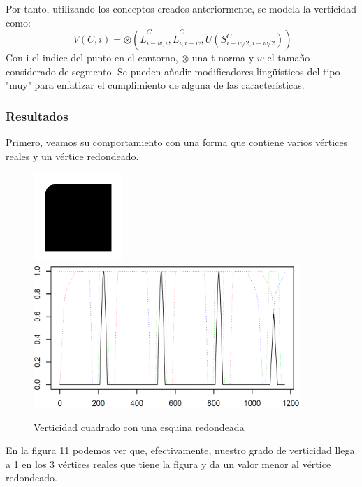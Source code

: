 Por tanto, utilizando los conceptos creados anteriormente, se modela la verticidad como:\\

\[
\ \tilde{V}(C,i) = \otimes \left(\tilde{L}^C_{i-w,i}, \tilde{L}^C_{i,i+w},  \tilde{U}(S^C_{i-w/2,i+w/2})   \right)
\]
Con i el indice del punto en el contorno, $ \otimes $ una t-norma y $w$ el tamaño considerado de segmento. Se pueden añadir modificadores lingüísticos del tipo "muy" para enfatizar el cumplimiento de alguna de las características.

\subsubsection{Resultados}

Primero, veamos su comportamiento con una forma que contiene varios vértices reales y un vértice redondeado.\\

\begin{figure}[H]
\begin{center}

\includegraphics[width=0.3\textwidth]{img/fig4.png}
\newline
\includegraphics[width=0.9\textwidth]{img/vert-fig04-novvery.png}
\end{center}

\caption{Verticidad cuadrado con una esquina redondeada}
\end{figure}

En la figura 11 podemos ver que, efectivamente, nuestro grado de verticidad llega a 1 en los 3 vértices reales que tiene la figura y da un valor menor al vértice redondeado.\\


